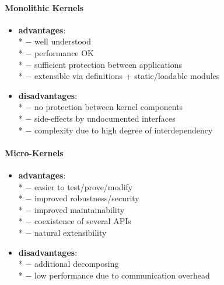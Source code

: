 \paragraph{Monolithic Kernels}
\begin{itemize}
  \item \textbf{advantages}: \\*
    $ - $ well understood \\*
    $ - $ performance OK \\*
    $ - $ sufficient protection between applications \\*
    $ - $ extensible via definitions + static/loadable modules
  \item \textbf{disadvantages}: \\*
    $ - $ no protection between kernel components \\*
    $ - $ side-effects by undocumented interfaces \\*
    $ - $ complexity due to high degree of interdependency
\end{itemize}

\paragraph{Micro-Kernels}
\begin{itemize}
  \item \textbf{advantages}: \\*
    $ - $ easier to test/prove/modify \\*
    $ - $ improved robustness/security \\*
    $ - $ improved maintainability \\*
    $ - $ coexistence of several APIs \\*
    $ - $ natural extensibility
  \item \textbf{disadvantages}: \\*
    $ - $ additional decomposing \\*
    $ - $ low performance due to communication overhead
\end{itemize}

